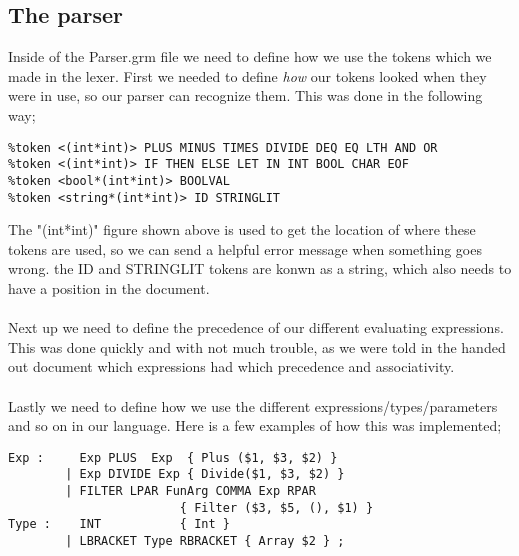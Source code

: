 \documentclass[12pt]{article}
\begin{document}
\subsection{The parser}
Inside of the Parser.grm file we need to define how we use the tokens which we made in the lexer. First we needed to define \textit{how} our tokens looked when they were in use, so our parser can recognize them. This was done in the following way;\\
\begin{verbatim}
%token <(int*int)> PLUS MINUS TIMES DIVIDE DEQ EQ LTH AND OR
%token <(int*int)> IF THEN ELSE LET IN INT BOOL CHAR EOF
%token <bool*(int*int)> BOOLVAL
%token <string*(int*int)> ID STRINGLIT
\end{verbatim}
The "(int*int)" figure shown above is used to get the location of where these tokens are used, so we can send a helpful error message when something goes wrong. the ID and STRINGLIT tokens are konwn as a string, which also needs to have a position in the document.\\\\
Next up we need to define the precedence of our different evaluating expressions. This was done quickly and with not much trouble, as we were told in the handed out document which expressions had which precedence and associativity.\\\\
Lastly we need to define how we use the different expressions/types/parameters and so on in our language. Here is a few examples of how this was implemented;\\
\begin{verbatim}
Exp :     Exp PLUS  Exp  { Plus ($1, $3, $2) }
        | Exp DIVIDE Exp { Divide($1, $3, $2) }
        | FILTER LPAR FunArg COMMA Exp RPAR
                        { Filter ($3, $5, (), $1) }
Type :    INT           { Int }
        | LBRACKET Type RBRACKET { Array $2 } ;                                  
\end{verbatim}
\end{document}
